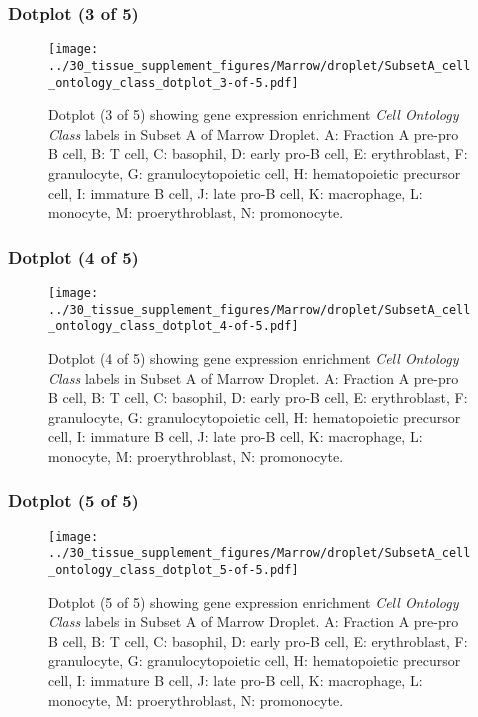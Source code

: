 \clearpage

\subsubsection{Dotplot (3 of 5)}
\begin{figure}[h]
\centering
\texttt{[image: ../30\_tissue\_supplement\_figures/Marrow/droplet/SubsetA\_cell\_ontology\_class\_dotplot\_3-of-5.pdf]}

\caption{ Dotplot (3 of 5)  showing gene expression enrichment \emph{Cell Ontology Class} labels in Subset A of Marrow Droplet. A: Fraction A pre-pro B cell, B: T cell, C: basophil, D: early pro-B cell, E: erythroblast, F: granulocyte, G: granulocytopoietic cell, H: hematopoietic precursor cell, I: immature B cell, J: late pro-B cell, K: macrophage, L: monocyte, M: proerythroblast, N: promonocyte.}
\end{figure}


\clearpage

\subsubsection{Dotplot (4 of 5)}
\begin{figure}[h]
\centering
\texttt{[image: ../30\_tissue\_supplement\_figures/Marrow/droplet/SubsetA\_cell\_ontology\_class\_dotplot\_4-of-5.pdf]}

\caption{ Dotplot (4 of 5)  showing gene expression enrichment \emph{Cell Ontology Class} labels in Subset A of Marrow Droplet. A: Fraction A pre-pro B cell, B: T cell, C: basophil, D: early pro-B cell, E: erythroblast, F: granulocyte, G: granulocytopoietic cell, H: hematopoietic precursor cell, I: immature B cell, J: late pro-B cell, K: macrophage, L: monocyte, M: proerythroblast, N: promonocyte.}
\end{figure}


\clearpage

\subsubsection{Dotplot (5 of 5)}
\begin{figure}[h]
\centering
\texttt{[image: ../30\_tissue\_supplement\_figures/Marrow/droplet/SubsetA\_cell\_ontology\_class\_dotplot\_5-of-5.pdf]}

\caption{ Dotplot (5 of 5)  showing gene expression enrichment \emph{Cell Ontology Class} labels in Subset A of Marrow Droplet. A: Fraction A pre-pro B cell, B: T cell, C: basophil, D: early pro-B cell, E: erythroblast, F: granulocyte, G: granulocytopoietic cell, H: hematopoietic precursor cell, I: immature B cell, J: late pro-B cell, K: macrophage, L: monocyte, M: proerythroblast, N: promonocyte.}
\end{figure}



